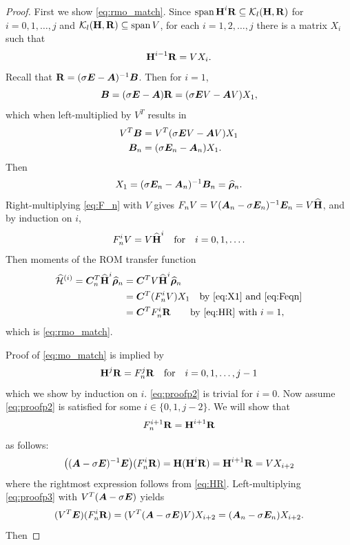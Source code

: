 \medskip
\begin{proof}
First we show \eqref{eq:rmo_match}.
Since $\operatorname*{span} \textbf{\textup{H}}^i \textbf{\textup{R}}\subseteq \mathcal{K}_{l}({\textbf{\textup{H}}},{\textbf{\textup{R}}})$ for $i=0,1,\ldots, j$ and  $\mathcal{K}_{l}({\textbf{\textup{H}}},{\textbf{\textup{R}}}) \subseteq \operatorname*{span} V$, for each $i=1,2,\ldots,j$ there is a matrix $X_i$ such that 
\begin{equation}
\textbf{\textup{H}}^{i-1} \textbf{\textup{R}} = V X_i.  
\label{eq:HR}
\end{equation}
Recall that  $\textbf{\textup{R}} = (\sigma \bm{E} - \bm{A})^{-1} \bm{B}$. Then for $i=1$, 
\[
\bm{B} = (\sigma \bm{E} - \bm{A})\textbf{\textup{R}} = (\sigma \bm{E} V - \bm{A} V)X_1,
\]
which when left-multiplied by $V^T$ results in
\begin{align*}
V^T \bm{B} &= V^T(\sigma \bm{E} V - \bm{A} V)X_1\\ 
\bm{B}_n &= (\sigma \bm{E}_n- \bm{A}_n)X_1.
\end{align*}
Then
\begin{equation}
X_1 = (\sigma \bm{E}_n- \bm{A}_n)^{-1}\bm{B}_n = \widehat{\boldsymbol{\rho}}_n.
\label{eq:X1}
\end{equation}
Right-multiplying \eqref{eq:F_n} with $V$ gives $F_n V =  V(\bm{A}_n-\sigma \bm{E}_n)^{-1}\bm{E}_n = V \widehat{\textbf{\textup{H}}}$, and by induction on $i$, 
\begin{equation}
F_n^i V =   V \widehat{\textbf{\textup{H}}}^i\quad\text{for}\quad i =0,1,\ldots .
\label{eq:Feqn}
\end{equation}
Then moments of the ROM transfer function 
\begin{align*}
\widehat{\mathcal{H}}^{(i)} = \bm{C}_n^T \widehat{\textbf{\textup{H}}}^i \widehat{\boldsymbol{\rho}}_n 
&= \bm{C}^T V  \widehat{\textbf{\textup{H}}}^i \widehat{\boldsymbol{\rho}}_n \\
&= \bm{C}^T (F_n^i V) X_1 \quad \text{by \eqref{eq:X1} and \eqref{eq:Feqn}} \\
&= \bm{C}^T F_n^i \textbf{\textup{R}} \qquad \text{by \eqref{eq:HR} with } i=1,
\end{align*}
which is \eqref{eq:rmo_match}.

Proof of  \eqref{eq:mo_match} is implied by   
\begin{equation}
 \textbf{\textup{H}}^j \textbf{\textup{R}} = F^j_n \textbf{\textup{R}} \quad \text{for}\quad i=0,1,\ldots,j-1
\label{eq:proofp2}
\end{equation}
 which we show by induction on $i$.  \eqref{eq:proofp2} is trivial for $i=0$.  Now assume \eqref{eq:proofp2} is satisfied for some $i\in\{0,1,j-2\}$. We will show that 
\[
F^{i+1}_n \textbf{\textup{R}} = \textbf{\textup{H}}^{i+1}\textbf{\textup{R}}
\]
as follows:
\begin{equation}
\big( (\bm{A}-\sigma \bm{E})^{-1}\bm{E} \big)  (F_n^i \textbf{\textup{R}}) = \textbf{\textup{H}}(\textbf{\textup{H}}^i \textbf{\textup{R}}) = \textbf{\textup{H}}^{i+1} \textbf{\textup{R}}
 = V X_{i+2}
\label{eq:proofp3}
\end{equation}
where the rightmost expression follows from \eqref{eq:HR}. 
Left-multiplying \eqref{eq:proofp3} with $V^T(\bm{A}-\sigma \bm{E})$ yields
\begin{equation}
(V^T \bm{E})(F_n^i\textbf{\textup{R}}) = (V^T(\bm{A}-\sigma \bm{E})V)X_{i+2} = (\bm{A}_n - \sigma \bm{E}_n)X_{i+2}.
\label{eq:proofp4}
\end{equation}
Then 



\end{proof}
